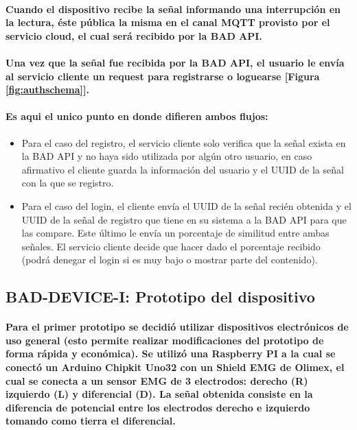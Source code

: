 \documentclass{article}
\begin{document}
\paragraph{
Cuando el dispositivo recibe la señal informando una interrupción en la lectura, éste pública la misma en el canal MQTT provisto por el servicio cloud, el cual será recibido por la BAD API.
}
\paragraph{
Una vez que la señal fue recibida por la BAD API, el usuario le envía al servicio cliente un request para registrarse o loguearse [Figura \ref{fig:authschema}].
}
\paragraph{
Es aqui el unico punto en donde difieren ambos flujos:
}
\begin{itemize}
    \item Para el caso del registro, el servicio cliente solo verifica que la señal exista en la BAD API y no haya sido utilizada por algún otro usuario, en caso afirmativo el cliente guarda la información del usuario y el UUID de la señal con la que se registro.
    \item Para el caso del login, el cliente envía el UUID de la señal recién obtenida y el UUID de la señal de registro que tiene en su sistema a la BAD API para que las compare. Este último le envía un porcentaje de similitud entre ambas señales. El servicio cliente decide que hacer dado el porcentaje recibido (podrá denegar el login si es muy bajo o mostrar parte del contenido).
\end{itemize}


\subsection{BAD-DEVICE-I: Prototipo del dispositivo}
\paragraph{
Para el primer prototipo se decidió utilizar dispositivos electrónicos de uso general (esto permite realizar modificaciones del prototipo de forma rápida y económica). Se utilizó una Raspberry PI a la cual se conectó un Arduino Chipkit Uno32 con un Shield EMG de Olimex, el cual se conecta a un sensor EMG de 3 electrodos: derecho (R) izquierdo (L) y diferencial (D). La señal obtenida consiste en la diferencia de potencial entre los electrodos derecho e izquierdo tomando como tierra el diferencial.
}
\end{document}
